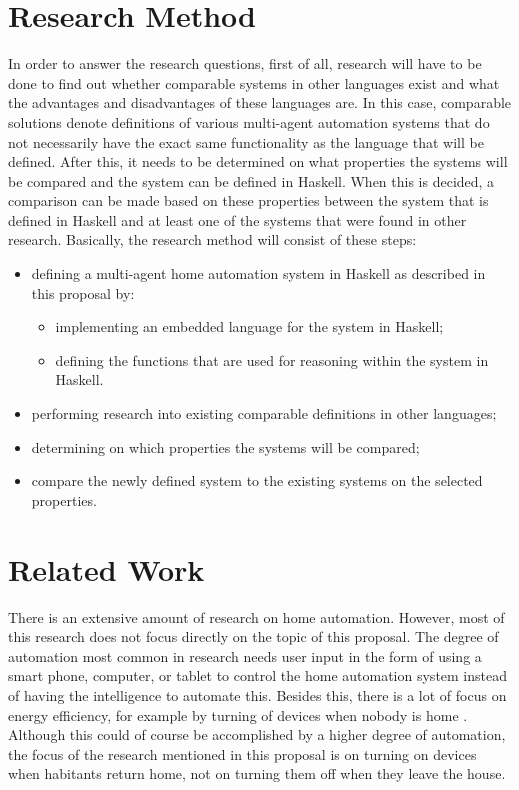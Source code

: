 \documentclass{sig-alternate-br}
\begin{document}
\section{Research Method}
In order to answer the research questions, first of all, research will have to be done to find out whether comparable systems in other languages exist and what the advantages and disadvantages of these languages are. In this case, comparable solutions denote definitions of various multi-agent automation systems that do not necessarily have the exact same functionality as the language that will be defined. After this, it needs to be determined on what properties the systems will be compared and the system can be defined in Haskell. When this is decided, a comparison can be made based on these properties between the system that is defined in Haskell and at least one of the systems that were found in other research. Basically, the research method will consist of these steps:
\begin{itemize}
\item defining a multi-agent home automation system in Haskell as described in this proposal by:
\begin{itemize}
\item implementing an embedded language for the system in Haskell;
\item defining the functions that are used for reasoning within the system in Haskell.
\end{itemize}
\item performing research into existing comparable definitions in other languages;
\item determining on which properties the systems will be compared;

\item compare the newly defined system to the existing systems on the selected properties.
\end{itemize}
\balancecolumns 
\section{Related Work}
There is an extensive amount of research on home automation. However, most of this research does not focus directly on the topic of this proposal.  The degree of automation most common in research needs user input in the form of using a smart phone, computer, or tablet to control the home automation system instead of having the intelligence to automate this. Besides this, there is a lot of focus on energy efficiency, for example by turning of devices when nobody is home \cite{sha}. Although this could of course be accomplished by a higher degree of automation, the focus of the research mentioned in this proposal is on turning on devices when habitants return home, not on turning them off when they leave the house. \cite{mast}
\end{document}
